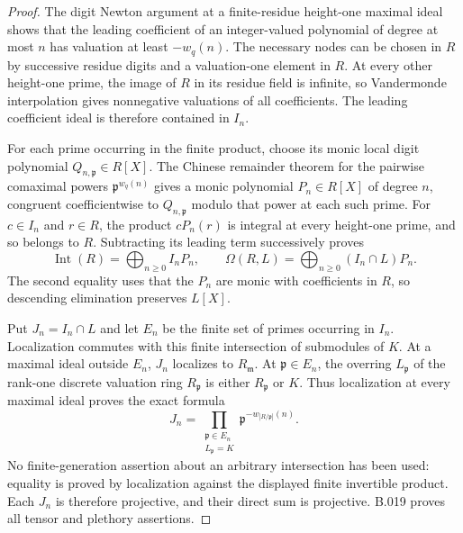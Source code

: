 \begin{proof}
The digit Newton argument at a finite-residue height-one maximal
ideal shows that the leading coefficient of an integer-valued
polynomial of degree at most $n$ has valuation at least
$-w_q(n)$. The necessary nodes can be chosen in $R$ by successive
residue digits and a valuation-one element in $R$.
At every other height-one prime, the image of $R$ in its residue
field is infinite, so Vandermonde interpolation gives
nonnegative valuations of all coefficients. The leading
coefficient ideal is therefore contained in $I_n$.

For each prime occurring in the finite product, choose its monic
local digit polynomial $Q_{n,\mathfrak p}\in R[X]$.
The Chinese remainder theorem for the pairwise comaximal
powers $\mathfrak p^{w_q(n)}$ gives a monic polynomial
$P_n\in R[X]$ of degree $n$, congruent coefficientwise to
$Q_{n,\mathfrak p}$ modulo that power at each such prime.
For $c\in I_n$ and $r\in R$, the product $cP_n(r)$ is integral
at every height-one prime, and so belongs to $R$.
Subtracting its leading term successively proves
\[
 \operatorname{Int}(R)=\bigoplus_{n\ge0}I_nP_n,\qquad
 \Omega(R,L)=\bigoplus_{n\ge0}(I_n\cap L)P_n.
\]
The second equality uses that the $P_n$ are monic with
coefficients in $R$, so descending elimination preserves $L[X]$.

Put $J_n=I_n\cap L$ and let $E_n$ be the finite set of primes
occurring in $I_n$. Localization commutes with this finite
intersection of submodules of $K$. At a maximal ideal outside
$E_n$, $J_n$ localizes to $R_{\mathfrak m}$. At
$\mathfrak p\in E_n$, the overring $L_{\mathfrak p}$ of the
rank-one discrete valuation ring $R_{\mathfrak p}$ is either
$R_{\mathfrak p}$ or $K$. Thus localization at every maximal
ideal proves the exact formula
\[
 J_n=\prod_{\substack{\mathfrak p\in E_n\\L_{\mathfrak p}=K}}
                 \mathfrak p^{-w_{|R/\mathfrak p|}(n)}.
\]
No finite-generation assertion about an arbitrary intersection
has been used: equality is proved by localization against the
displayed finite invertible product. Each $J_n$ is therefore
projective, and their direct sum is projective. B.019 proves
all tensor and plethory assertions.
\end{proof}

